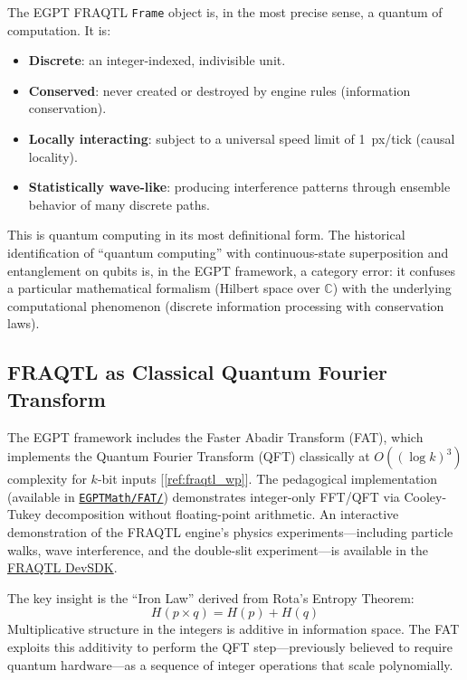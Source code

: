 \documentclass[11pt,a4paper]{article}
\begin{document}
The EGPT FRAQTL \texttt{Frame} object is, in the most precise sense, a quantum of computation. It is:

\begin{itemize}
    \item \textbf{Discrete}: an integer-indexed, indivisible unit.
    \item \textbf{Conserved}: never created or destroyed by engine rules (information conservation).
    \item \textbf{Locally interacting}: subject to a universal speed limit of 1~px/tick (causal locality).
    \item \textbf{Statistically wave-like}: producing interference patterns through ensemble behavior of many discrete paths.
\end{itemize}

This is quantum computing in its most definitional form. The historical identification of ``quantum computing'' with continuous-state superposition and entanglement on qubits is, in the EGPT framework, a category error: it confuses a particular mathematical formalism (Hilbert space over $\mathbb{C}$) with the underlying computational phenomenon (discrete information processing with conservation laws).

\subsection{FRAQTL as Classical Quantum Fourier Transform}

The EGPT framework includes the Faster Abadir Transform (FAT), which implements the Quantum Fourier Transform (QFT) classically at $O((\log k)^3)$ complexity for $k$-bit inputs [\ref{ref:fraqtl_wp}]. The pedagogical implementation (available in \href{https://eabadir.github.io/EGPT/EGPTMath/FAT/}{\texttt{EGPTMath/FAT/}}) demonstrates integer-only FFT/QFT via Cooley-Tukey decomposition without floating-point arithmetic. An interactive demonstration of the FRAQTL engine's physics experiments---including particle walks, wave interference, and the double-slit experiment---is available in the \href{https://eabadir.github.io/EGPT/www/fraqtl_devsdk/index.html}{FRAQTL DevSDK}.

The key insight is the ``Iron Law'' derived from Rota's Entropy Theorem:
\begin{equation}
    H(p \times q) = H(p) + H(q)
\end{equation}
Multiplicative structure in the integers is additive in information space. The FAT exploits this additivity to perform the QFT step---previously believed to require quantum hardware---as a sequence of integer operations that scale polynomially.
\end{document}
